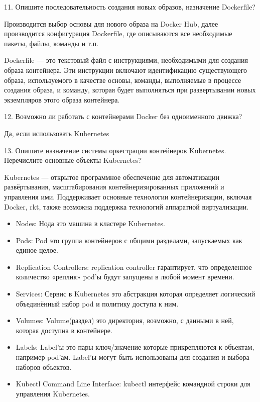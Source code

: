 11. Опишите последовательность создания новых образов, назначение Dockerfile?

Производится выбор основы для нового образа на Docker Hub, далее производится конфигурация Dockerfile, где описываются все необходимые пакеты, файлы, команды и т.п.

Dockerfile — это текстовый файл с инструкциями, необходимыми для создания образа контейнера. Эти инструкции включают идентификацию существующего образа, используемого в качестве основы, команды, выполняемые в процессе создания образа, и команду, которая будет выполняться при развертывании новых экземпляров этого образа контейнера.

12. Возможно ли работать с контейнерами Docker без одноименного движка?

Да, если использовать Kubernetes

13. Опишите назначение системы оркестрации контейнеров Kubernetes. Перечислите основные объекты Kubernetes?

Kubernetes — открытое программное обеспечение для автоматизации развёртывания, масштабирования контейнеризированных приложений и управления ими. Поддерживает основные технологии контейнеризации, включая Docker, rkt, также возможна поддержка технологий аппаратной виртуализации.

\begin{itemize}
    \item Nodes: Нода это машина в кластере Kubernetes.
    \item Pods: Pod это группа контейнеров с общими разделами, запускаемых как единое целое.
    \item Replication Controllers: replication controller гарантирует, что определенное количество «реплик» pod'ы будут запущены в любой момент времени.
    \item Services: Сервис в Kubernetes это абстракция которая определяет логический объединённый набор pod и политику доступа к ним.
    \item Volumes: Volume(раздел) это директория, возможно, с данными в ней, которая доступна в контейнере.
    \item Labels: Label'ы это пары ключ/значение которые прикрепляются к объектам, например pod'ам. Label'ы могут быть использованы для создания и выбора наборов объектов.
    \item Kubectl Command Line Interface: kubectl интерфейс командной строки для управления Kubernetes.
\end{itemize}